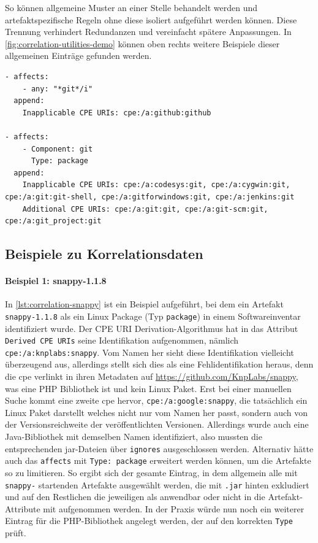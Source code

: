 So können allgemeine Muster an einer Stelle behandelt werden und artefaktspezifische Regeln ohne diese isoliert aufgeführt werden können.
Diese Trennung verhindert Redundanzen und vereinfacht spätere Anpassungen.
In \autoref{fig:correlation-utilities-demo} können oben rechts weitere Beispiele dieser allgemeinen Einträge gefunden werden.

\begin{lstlisting}[style=yaml,caption={Inkrementelle Korrelationseinträge für das Kommandozeilentool git},label={lst:correlation-incremental-git-example}]
- affects:
    - any: "*git*/i"
  append:
    Inapplicable CPE URIs: cpe:/a:github:github

- affects:
    - Component: git
      Type: package
  append:
    Inapplicable CPE URIs: cpe:/a:codesys:git, cpe:/a:cygwin:git, cpe:/a:git:git-shell, cpe:/a:gitforwindows:git, cpe:/a:jenkins:git
    Additional CPE URIs: cpe:/a:git:git, cpe:/a:git-scm:git, cpe:/a:git_project:git
\end{lstlisting}

\subsection{Beispiele zu Korrelationsdaten}

\paragraph{Beispiel 1: snappy-1.1.8}
In \autoref{lst:correlation-snappy} ist ein Beispiel aufgeführt, bei dem ein Artefakt \texttt{snappy-1.1.8} als ein Linux Package (Typ \texttt{package}) in einem Softwareinventar identifiziert wurde.
Der CPE URI Derivation-Algorithmus hat in das Attribut \texttt{Derived CPE URIs} seine Identifikation aufgenommen, nämlich \texttt{cpe:/a:knplabs:snappy}.
Vom Namen her sieht diese Identifikation vielleicht überzeugend aus, allerdings stellt sich dies als eine Fehlidentifikation heraus, denn die \acrshort{cpe} verlinkt in ihren Metadaten auf \url{https://github.com/KnpLabs/snappy}, was eine PHP Bibliothek ist und kein Linux Paket.
Erst bei einer manuellen Suche kommt eine zweite \acrshort{cpe} hervor, \texttt{cpe:/a:google:snappy}, die tatsächlich ein Linux Paket darstellt welches nicht nur vom Namen her passt, sondern auch von der Versionsreichweite der veröffentlichten Versionen.
Allerdings wurde auch eine Java-Bibliothek mit demselben Namen identifiziert, also mussten die entsprechenden jar-Dateien über \texttt{ignores} ausgeschlossen werden.
Alternativ hätte auch das \texttt{affects} mit \texttt{Type: package} erweitert werden können, um die Artefakte so zu limitieren.
So ergibt sich der gesamte Eintrag, in dem allgemein alle mit \texttt{snappy-} startenden Artefakte ausgewählt werden, die mit \texttt{.jar} hinten exkludiert und auf den Restlichen die jeweiligen  als anwendbar oder nicht in die Artefakt-Attribute mit aufgenommen werden.
In der Praxis würde nun noch ein weiterer Eintrag für die PHP-Bibliothek angelegt werden, der auf den korrekten \texttt{Type} prüft.

